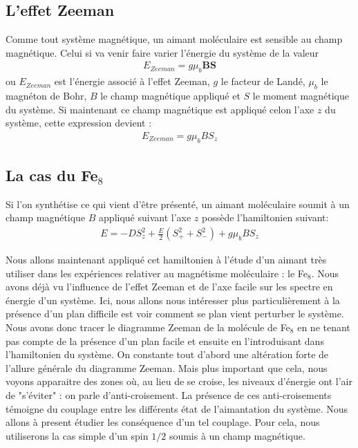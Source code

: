 \subsection{L'effet Zeeman}
Comme tout système magnétique, un aimant moléculaire est sensible au champ magnétique. Celui si va venir faire varier l'énergie du système de la valeur
\begin{eqnarray}
E_{Zeeman}= g\mu_b \mathbf{BS} \nonumber
\end{eqnarray}
ou $E_{Zeeman}$ est l'énergie associé à l'effet Zeeman, $g$ le facteur de Landé, $\mu_b$ le magnéton de Bohr, $B$ le champ magnétique appliqué et $S$ le moment magnétique du système. Si maintenant ce champ magnétique est appliqué celon l'axe $z$ du système, cette expression devient :
\begin{eqnarray}
E_{Zeeman}= g\mu_b B S_z \nonumber
\end{eqnarray}

\subsection{La cas du Fe$_8$}
Si l'on synthétise ce qui vient d'\^etre présenté, un aimant moléculaire soumit à un champ magnétique $B$ appliqué suivant l'axe $z$ possède l'hamiltonien suivant:
\begin{eqnarray}
E =  -DS_z^2 + \frac{E}{2} ( S_+^2  + S_-^2) + g\mu_b B S_z 
\end{eqnarray}


Nous allons maintenant appliqué cet hamiltonien à l'étude d'un aimant très utiliser dans les expériences relativer au magnétisme moléculaire : le Fe$_8$. Nous avons déjà vu l'influence de l'effet Zeeman et de l'axe facile sur les spectre en énergie d'un système. Ici, nous allons nous intéresser plus particulièrement à la présence d'un plan difficile est voir comment se plan vient perturber le système. Nous avons donc tracer le diagramme Zeeman de la molécule de Fe$_8$ en ne tenant pas compte de la présence d'un plan facile et ensuite en l'introduisant dans l'hamiltonien du système. On constante tout d'abord une altération forte de l'allure générale du diagramme Zeeman. Mais plus important que cela, nous voyons apparaitre des zones où, au lieu de se croise, les niveaux d'énergie ont l'air de "s'éviter" : on parle d'anti-croisement. La présence de ces anti-croisements témoigne du couplage entre les différents état de l'aimantation du système. Nous allons à present étudier les conséquence d'un tel couplage. Pour cela, nous utiliserons la cas simple d'un spin $1/2$ soumis à un champ magnétique.